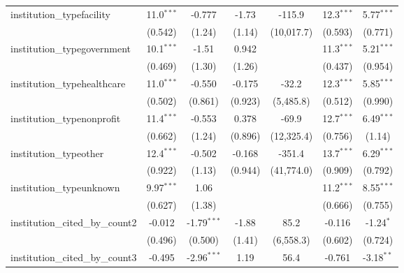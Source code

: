 \begin{tabular}{lcccccc}
   institution\_typefacility             & 11.0$^{***}$   & -0.777        & -1.73         & -115.9     & 12.3$^{***}$  & 5.77$^{***}$\\   
                                         & (0.542)        & (1.24)        & (1.14)        & (10,017.7) & (0.593)       & (0.771)\\   
   institution\_typegovernment           & 10.1$^{***}$   & -1.51         & 0.942         &            & 11.3$^{***}$  & 5.21$^{***}$\\   
                                         & (0.469)        & (1.30)        & (1.26)        &            & (0.437)       & (0.954)\\   
   institution\_typehealthcare           & 11.0$^{***}$   & -0.550        & -0.175        & -32.2      & 12.3$^{***}$  & 5.85$^{***}$\\   
                                         & (0.502)        & (0.861)       & (0.923)       & (5,485.8)  & (0.512)       & (0.990)\\   
   institution\_typenonprofit            & 11.4$^{***}$   & -0.553        & 0.378         & -69.9      & 12.7$^{***}$  & 6.49$^{***}$\\   
                                         & (0.662)        & (1.24)        & (0.896)       & (12,325.4) & (0.756)       & (1.14)\\   
   institution\_typeother                & 12.4$^{***}$   & -0.502        & -0.168        & -351.4     & 13.7$^{***}$  & 6.29$^{***}$\\   
                                         & (0.922)        & (1.13)        & (0.944)       & (41,774.0) & (0.909)       & (0.792)\\   
   institution\_typeunknown              & 9.97$^{***}$   & 1.06          &               &            & 11.2$^{***}$  & 8.55$^{***}$\\   
                                         & (0.627)        & (1.38)        &               &            & (0.666)       & (0.755)\\   
   institution\_cited\_by\_count2        & -0.012         & -1.79$^{***}$ & -1.88         & 85.2       & -0.116        & -1.24$^{*}$\\   
                                         & (0.496)        & (0.500)       & (1.41)        & (6,558.3)  & (0.602)       & (0.724)\\   
   institution\_cited\_by\_count3        & -0.495         & -2.96$^{***}$ & 1.19          & 56.4       & -0.761        & -3.18$^{**}$\\   

\end{tabular}
